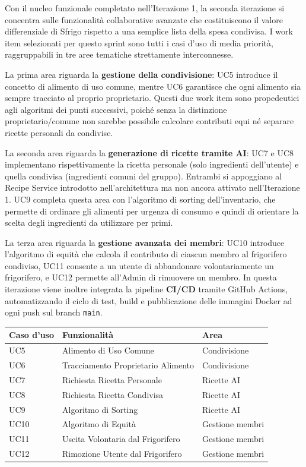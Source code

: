 \documentclass[12pt,a4paper,twoside]{report}
\begin{document}
Con il nucleo funzionale completato nell'Iterazione 1, la seconda iterazione si concentra sulle funzionalità collaborative avanzate che costituiscono il valore differenziale di Sfrigo rispetto a una semplice lista della spesa condivisa. I work item selezionati per questo sprint sono tutti i casi d'uso di media priorità, raggruppabili in tre aree tematiche strettamente interconnesse.

La prima area riguarda la \textbf{gestione della condivisione}: UC5 introduce il concetto di alimento di uso comune, mentre UC6 garantisce che ogni alimento sia sempre tracciato al proprio proprietario. Questi due work item sono propedeutici agli algoritmi dei punti successivi, poiché senza la distinzione proprietario/comune non sarebbe possibile calcolare contributi equi né separare ricette personali da condivise.

La seconda area riguarda la \textbf{generazione di ricette tramite AI}: UC7 e UC8 implementano rispettivamente la ricetta personale (solo ingredienti dell'utente) e quella condivisa (ingredienti comuni del gruppo). Entrambi si appoggiano al Recipe Service introdotto nell'architettura ma non ancora attivato nell'Iterazione 1. UC9 completa questa area con l'algoritmo di sorting dell'inventario, che permette di ordinare gli alimenti per urgenza di consumo e quindi di orientare la scelta degli ingredienti da utilizzare per primi.

La terza area riguarda la \textbf{gestione avanzata dei membri}: UC10 introduce l'algoritmo di equità che calcola il contributo di ciascun membro al frigorifero condiviso, UC11 consente a un utente di abbandonare volontariamente un frigorifero, e UC12 permette all'Admin di rimuovere un membro. In questa iterazione viene inoltre integrata la pipeline \textbf{CI/CD} tramite GitHub Actions, automatizzando il ciclo di test, build e pubblicazione delle immagini Docker ad ogni push sul branch \texttt{main}.

\begin{center}
\begin{tabular}{@{} l l l @{}}
  \toprule
  \textbf{Caso d'uso} & \textbf{Funzionalità} & \textbf{Area} \\
  \midrule
  UC5   & Alimento di Uso Comune             & Condivisione \\
  UC6   & Tracciamento Proprietario Alimento & Condivisione \\
  UC7   & Richiesta Ricetta Personale        & Ricette AI \\
  UC8   & Richiesta Ricetta Condivisa        & Ricette AI \\
  UC9   & Algoritmo di Sorting               & Ricette AI \\
  UC10  & Algoritmo di Equità               & Gestione membri \\
  UC11  & Uscita Volontaria dal Frigorifero  & Gestione membri \\
  UC12  & Rimozione Utente dal Frigorifero   & Gestione membri \\
  \bottomrule
\end{tabular}
\end{center}
\end{document}
